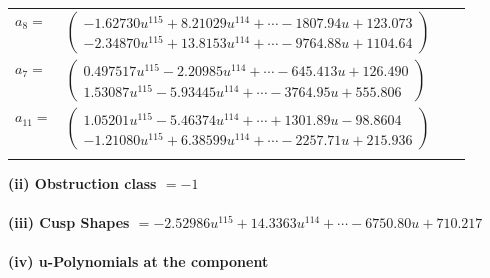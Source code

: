 \documentclass[1p]{elsarticle_modified}
\theoremstyle{definition}
\begin{document}
\begin{tabular}{m{7pt} m{180pt} m{7pt} m{180pt} }
\flushright $a_{8}=$&$\begin{pmatrix}-1.62730 u^{115}+8.21029 u^{114}+\cdots-1807.94 u+123.073\\-2.34870 u^{115}+13.8153 u^{114}+\cdots-9764.88 u+1104.64\end{pmatrix}$ \\
\flushright $a_{7}=$&$\begin{pmatrix}0.497517 u^{115}-2.20985 u^{114}+\cdots-645.413 u+126.490\\1.53087 u^{115}-5.93445 u^{114}+\cdots-3764.95 u+555.806\end{pmatrix}$ \\
\flushright $a_{11}=$&$\begin{pmatrix}1.05201 u^{115}-5.46374 u^{114}+\cdots+1301.89 u-98.8604\\-1.21080 u^{115}+6.38599 u^{114}+\cdots-2257.71 u+215.936\end{pmatrix}$\\&\end{tabular}
\flushleft \textbf{(ii) Obstruction class $= -1$}\\~\\
\flushleft \textbf{(iii) Cusp Shapes $= -2.52986 u^{115}+14.3363 u^{114}+\cdots-6750.80 u+710.217$}\\~\\
\newpage\renewcommand{\arraystretch}{1}
\flushleft \textbf{(iv) u-Polynomials at the component}\newline \\
\end{document}
